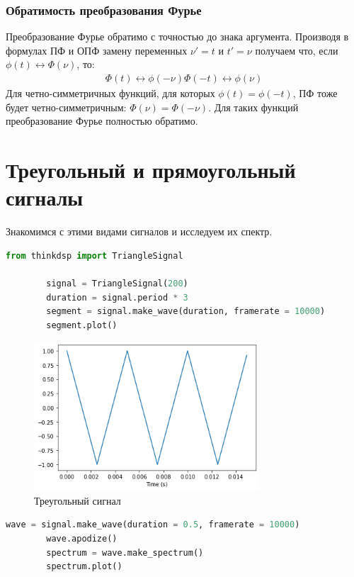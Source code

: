\documentclass[a4paper, 12pt]{report}
\begin{document}
	\subsection{Обратимость преобразования Фурье}
	Преобразование Фурье обратимо с точностью до знака аргумента. Производя в формулах ПФ и ОПФ замену переменных $\nu' = t$  и $t' = \nu$ получаем что, если $\phi(t) \leftrightarrow \Phi(\nu)$, то:
	\[
        		\begin{aligned}
            		\Phi(t) \leftrightarrow \phi(-\nu)
			\Phi(-t) \leftrightarrow \phi(\nu)
        		\end{aligned}
    	\]
	Для четно-симметричных функций, для которых $\phi(t) = \phi(-t)$, ПФ тоже будет четно-симметричным: $\Phi(\nu) = \Phi(-\nu)$. Для таких функций преобразование Фурье полностью обратимо.
	
	\chapter{Треугольный и прямоугольный сигналы}
	Знакомимся с этими видами сигналов и исследуем их спектр.
	\begin{lstlisting}[language=Python,caption=Построение треугольного сигнала]
		from thinkdsp import TriangleSignal

		signal = TriangleSignal(200)
		duration = signal.period * 3
		segment = signal.make_wave(duration, framerate = 10000)
		segment.plot()
	\end{lstlisting}
	\begin{figure}[H]
		\centering
		\includegraphics[width=0.75\textwidth]{tri_segment.png}
		\caption{Треугольный сигнал}
		\label{fig:tri_segment}
	\end{figure}
	\begin{lstlisting}[language=Python,caption=Построение спектра сигнала]
		wave = signal.make_wave(duration = 0.5, framerate = 10000)
		wave.apodize()
		spectrum = wave.make_spectrum()
		spectrum.plot()
	\end{lstlisting}
\end{document}
